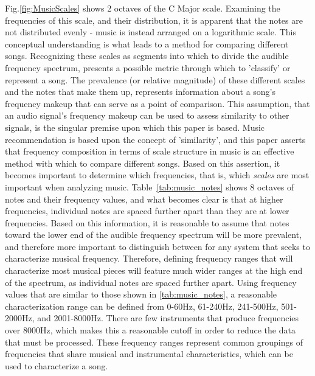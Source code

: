 \documentclass[conference]{IEEEtran}
\begin{document}
Fig.\eqref{fig:MusicScales} shows 2 octaves of the C Major scale. Examining the frequencies of this scale, and their distribution, it is apparent that the notes are not distributed evenly - music is instead arranged on a logarithmic scale. This conceptual understanding is what leads to a method for comparing different songs. Recognizing these scales as segments into which to divide the audible frequency spectrum, presents a possible metric through which to 'classify' or represent a song. The prevalence (or relative magnitude) of these different scales and the notes that make them up, represents information about a song's frequency makeup that can serve as a point of comparison. This assumption, that an audio signal's frequency makeup can be used to assess similarity to other signals, is the singular premise upon which this paper is based. Music recommendation is based upon the concept of 'similarity', and this paper asserts that frequency composition in terms of scale structure in music is an effective method with which to compare different songs. Based on this assertion, it becomes important to determine which frequencies, that is, which \textit{scales} are most important when analyzing music. Table~\eqref{tab:music_notes} shows 8 octaves of notes and their frequency values, and what becomes clear is that at higher frequencies, individual notes are spaced further apart than they are at lower frequencies. Based on this information, it is reasonable to assume that notes toward the lower end of the audible frequency spectrum will be more prevalent, and therefore more important to distinguish between for any system that seeks to characterize musical frequency. Therefore, defining frequency ranges that will characterize most musical pieces will feature much wider ranges at the high end of the spectrum, as individual notes are spaced further apart. Using frequency values that are similar to those shown in \eqref{tab:music_notes}, a reasonable characterization range can be defined from 0-60Hz, 61-240Hz, 241-500Hz, 501-2000Hz, and 2001-8000Hz. There are few instruments that produce frequencies over 8000Hz, which makes this a reasonable cutoff in order to reduce the data that must be processed. These frequency ranges represent common groupings of frequencies that share musical and instrumental characteristics, which can be used to characterize a song. 
\end{document}
